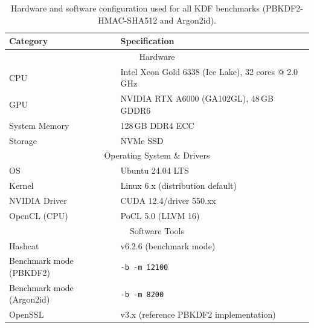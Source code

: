 \documentclass[mathematics,article,accept,pdftex,moreauthors]{Definitions/mdpi}
\begin{document}
\begin{table}[H]
\caption{Hardware and software configuration used for all KDF benchmarks (PBKDF2-HMAC-SHA512 and Argon2id).}
\label{tab:exp_setup}
\begin{tabularx}{\linewidth}{ll}
\toprule
\textbf{Category} & \textbf{Specification} \\
\midrule
\multicolumn{2}{c}{Hardware} \\ %
\midrule
CPU & Intel Xeon Gold 6338 (Ice Lake), 32 cores @ 2.0\,GHz \\
GPU & NVIDIA RTX A6000 (GA102GL), 48\,GB GDDR6 \\
System Memory & 128\,GB DDR4 ECC \\
Storage & NVMe SSD \\
\midrule
\multicolumn{2}{c}{Operating System \& Drivers} \\
\midrule
OS & Ubuntu 24.04 LTS \\
Kernel & Linux 6.x (distribution default) \\
NVIDIA Driver & CUDA 12.4/driver 550.xx \\
OpenCL (CPU) & PoCL 5.0 (LLVM 16) \\
\midrule
\multicolumn{2}{c}{Software Tools} \\
\midrule
Hashcat & v6.2.6 (benchmark mode) \\
Benchmark mode (PBKDF2) & \texttt{-b -m 12100} \\ %
Benchmark mode (Argon2id) & \texttt{-b -m 8200} \\
OpenSSL & v3.x (reference PBKDF2 implementation) \\

\end{tabularx}
\end{table}
\end{document}

